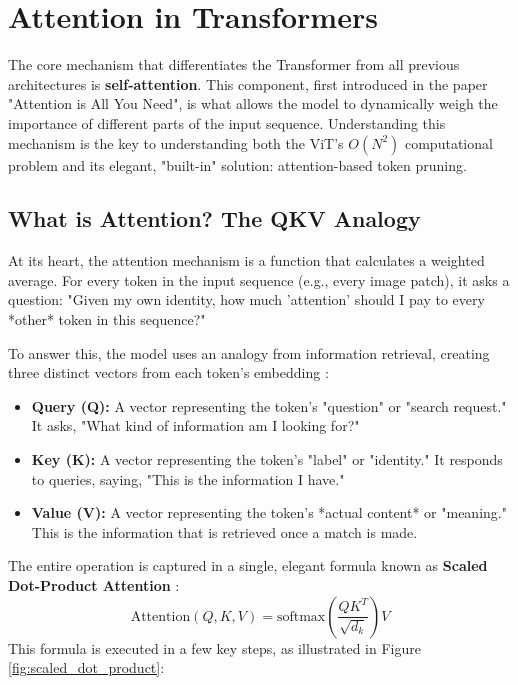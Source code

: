\chapter{Attention in Transformers}
The core mechanism that differentiates the Transformer from all previous architectures is \textbf{self-attention}. This component, first introduced in the paper "Attention is All You Need", is what allows the model to dynamically weigh the importance of different parts of the input sequence. Understanding this mechanism is the key to understanding both the ViT's $O(N^2)$ computational problem \cite{ref2} and its elegant, "built-in" solution: attention-based token pruning.

\section{What is Attention? The QKV Analogy}

At its heart, the attention mechanism is a function that calculates a weighted average. For every token in the input sequence (e.g., every image patch), it asks a question: "Given my own identity, how much 'attention' should I pay to every *other* token in this sequence?" \cite{ref2}

To answer this, the model uses an analogy from information retrieval, creating three distinct vectors from each token's embedding \cite{ref20}:
\begin{itemize}
    \item \textbf{Query (Q):} A vector representing the token's "question" or "search request." It asks, "What kind of information am I looking for?"
    \item \textbf{Key (K):} A vector representing the token's "label" or "identity." It responds to queries, saying, "This is the information I have."
    \item \textbf{Value (V):} A vector representing the token's *actual content* or "meaning." This is the information that is retrieved once a match is made.
\end{itemize}

The entire operation is captured in a single, elegant formula known as \textbf{Scaled Dot-Product Attention} \cite{ref2}:
$$\text{Attention}(Q, K, V) = \text{softmax} \left( \frac{Q K^T}{\sqrt{d_k}} \right) V$$
This formula is executed in a few key steps, as illustrated in Figure \ref{fig:scaled_dot_product}:

